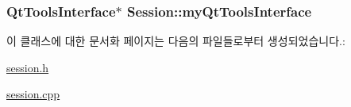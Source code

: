 \hypertarget{class_session_a1827a0341223eafa3859f249e73ebd38}{
\subsubsection[{my\-Qt\-Tools\-Interface}]{\setlength{\rightskip}{0pt plus 5cm}Qt\-Tools\-Interface$\ast$ Session\-::my\-Qt\-Tools\-Interface\hspace{0.3cm}{\ttfamily [private]}}}\label{class_session_a1827a0341223eafa3859f249e73ebd38}


이 클래스에 대한 문서화 페이지는 다음의 파일들로부터 생성되었습니다.\-:\begin{DoxyCompactItemize}
\item 
\hyperlink{session_8h}{session.\-h}\item 
\hyperlink{session_8cpp}{session.\-cpp}\end{DoxyCompactItemize}
